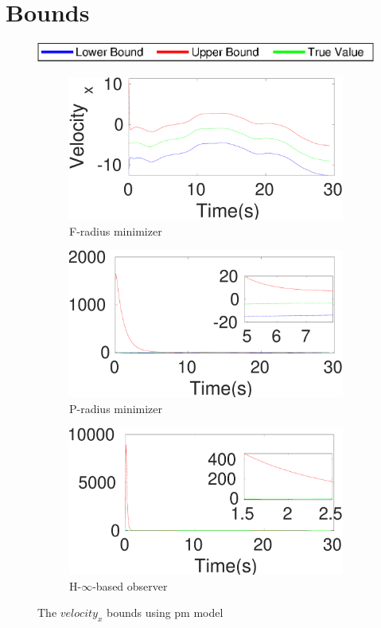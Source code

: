 \section{Bounds}
\begin{figure}[h]
\includegraphics[scale=0.8]{figures/legend}\\
\begin{subfigure}{0.32\textwidth}
\centering
\includegraphics[width=\linewidth]{figures/sm}\caption{F-radius minimizer}
\end{subfigure}
\begin{subfigure}{0.32\linewidth}
\centering
\includegraphics[width=\linewidth]{figures/prad}\caption{P-radius minimizer}
\end{subfigure}
\begin{subfigure}{0.32\linewidth}
\centering
\includegraphics[width=\linewidth]{figures/hinf}\caption{H-$\infty$-based observer}
\end{subfigure}
\caption{The $velocity_x$ bounds using pm model}
\label{fig:bound}
\end{figure}
